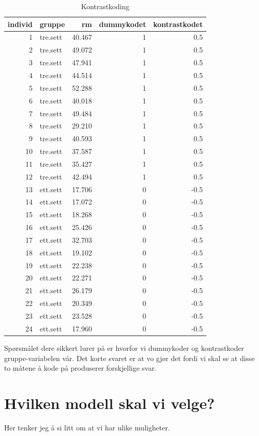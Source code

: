\documentclass[
]{book}
\begin{document}
\begin{table}

\caption{\label{tab:unnamed-chunk-6}Kontrastkoding}
\centering
\begin{tabular}[t]{r|l|r|r|r}
\hline
individ & gruppe & rm & dummykodet & kontrastkodet\\
\hline
1 & tre.sett & 40.467 & 1 & 0.5\\
\hline
2 & tre.sett & 49.072 & 1 & 0.5\\
\hline
3 & tre.sett & 47.941 & 1 & 0.5\\
\hline
4 & tre.sett & 44.514 & 1 & 0.5\\
\hline
5 & tre.sett & 52.288 & 1 & 0.5\\
\hline
6 & tre.sett & 40.018 & 1 & 0.5\\
\hline
7 & tre.sett & 49.484 & 1 & 0.5\\
\hline
8 & tre.sett & 29.210 & 1 & 0.5\\
\hline
9 & tre.sett & 40.593 & 1 & 0.5\\
\hline
10 & tre.sett & 37.587 & 1 & 0.5\\
\hline
11 & tre.sett & 35.427 & 1 & 0.5\\
\hline
12 & tre.sett & 42.494 & 1 & 0.5\\
\hline
13 & ett.sett & 17.706 & 0 & -0.5\\
\hline
14 & ett.sett & 17.072 & 0 & -0.5\\
\hline
15 & ett.sett & 18.268 & 0 & -0.5\\
\hline
16 & ett.sett & 25.426 & 0 & -0.5\\
\hline
17 & ett.sett & 32.703 & 0 & -0.5\\
\hline
18 & ett.sett & 19.102 & 0 & -0.5\\
\hline
19 & ett.sett & 22.238 & 0 & -0.5\\
\hline
20 & ett.sett & 22.271 & 0 & -0.5\\
\hline
21 & ett.sett & 26.179 & 0 & -0.5\\
\hline
22 & ett.sett & 20.349 & 0 & -0.5\\
\hline
23 & ett.sett & 23.528 & 0 & -0.5\\
\hline
24 & ett.sett & 17.960 & 0 & -0.5\\
\hline
\end{tabular}
\end{table}

Spørsmålet dere sikkert lurer på er hvorfor vi dummykoder og kontrastkoder gruppe-variabelen vår. Det korte svaret er at vo gjør det fordi vi skal se at disse to måtene å kode på produserer forskjellige svar.

\hypertarget{hvilken-modell-skal-vi-velge-1}{%
\chapter{Hvilken modell skal vi velge?}\label{hvilken-modell-skal-vi-velge-1}}

Her tenker jeg å si litt om at vi har ulike muligheter.

\hypertarget{appendix-appendices}{%
\appendix}


  
\end{document}
